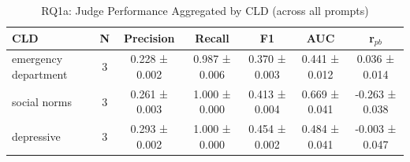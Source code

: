 \begin{table}[htbp]
\centreing
\caption{RQ1a: Judge Performance Aggregated by CLD (across all prompts)}
\label{tab:rq1a_by_cld}
\begin{tabular}{lcccccc}
\toprule
\textbf{CLD} & \textbf{N} & \textbf{Precision} & \textbf{Recall} & \textbf{F1} & \textbf{AUC} & \textbf{r$_{pb}$} \\
\midrule
emergency department & 3 & 0.228 ± 0.002 & 0.987 ± 0.006 & 0.370 ± 0.003 & 0.441 ± 0.012 & 0.036 ± 0.014 \\
social norms & 3 & 0.261 ± 0.003 & 1.000 ± 0.000 & 0.413 ± 0.004 & 0.669 ± 0.041 & -0.263 ± 0.038 \\
depressive & 3 & 0.293 ± 0.002 & 1.000 ± 0.000 & 0.454 ± 0.002 & 0.484 ± 0.041 & -0.003 ± 0.047 \\
\bottomrule
\end{tabular}
\end{table}